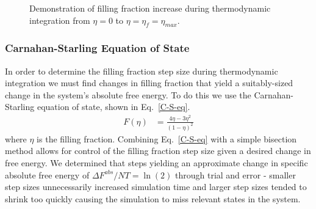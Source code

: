 \documentclass[12pt]{article}
\newcommand{\ignore}[1]{}
\begin{document}
\ignore{Should I detail the algorithm itself and string simulations together or consider the entire process $\eta=0\rightarrow\eta_max$ to be the algorithm?}



\ignore{is the distinction between infinite case and regular necessary? we always use infinite...}

\begin{figure} \centering
{}
\caption{Demonstration of filling fraction increase during thermodynamic integration from $\eta=0$ to $\eta=\eta_f=\eta_{max}$.}
\end{figure}

\subsubsection{Carnahan-Starling Equation of State}
In order to determine the filling fraction step size during thermodynamic integration we must find changes in filling fraction that yield a suitably-sized change in the system's absolute free energy. To do this we use the Carnahan-Starling equation of state, shown in Eq.~\ref{C-S-eq}.
\begin{align}
    F(\eta) &= \frac{4\eta - 3\eta^2}{(1-\eta)^2}   
    \label{C-S-eq}  
\end{align} 
where $\eta$ is the filling fraction. Combining Eq.~\ref{C-S-eq} with a simple bisection method allows for control of the filling fraction step size given a desired change in free energy. We determined that steps yielding an approximate change in specific absolute free energy of $\Delta F^{abs}/NT = \ln(2)$ through trial and error - smaller step sizes unnecessarily increased simulation time and larger step sizes tended to shrink too quickly causing the simulation to miss relevant states in the system. 
\end{document}
